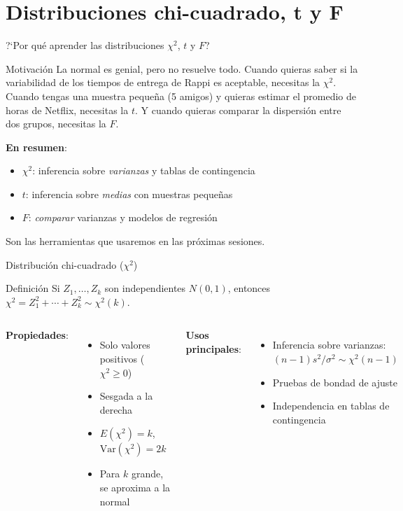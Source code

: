 \documentclass[aspectratio=169, 11pt]{beamer}
\begin{document}
\section{Distribuciones chi-cuadrado, t y F}

\begin{frame}{?`Por qu\'e aprender las distribuciones $\chi^2$, $t$ y $F$?}
\begin{exampleblock}{Motivaci\'on}
La normal es genial, pero no resuelve todo. Cuando quieras saber si la \alert{variabilidad} de los tiempos de entrega de Rappi es aceptable, necesitas la $\chi^2$. Cuando tengas una muestra peque\~na (5 amigos) y quieras estimar el promedio de horas de Netflix, necesitas la $t$. Y cuando quieras comparar la dispersi\'on entre dos grupos, necesitas la $F$.
\end{exampleblock}

\textbf{En resumen}:
\begin{itemize}\setlength{\itemsep}{1pt}
  \item \textbf{$\chi^2$}: inferencia sobre \emph{varianzas} y tablas de contingencia
  \item \textbf{$t$}: inferencia sobre \emph{medias} con muestras peque\~nas
  \item \textbf{$F$}: \emph{comparar} varianzas y modelos de regresi\'on
\end{itemize}

\alert{Son las herramientas que usaremos en las pr\'oximas sesiones.}
\end{frame}

\begin{frame}{Distribución chi-cuadrado ($\chi^2$)}
\begin{block}{Definición}
Si $Z_1, \ldots, Z_k$ son independientes $N(0,1)$, entonces
$\chi^2 = Z_1^2 + \cdots + Z_k^2 \sim \chi^2(k)$.
\end{block}

\begin{columns}[T]
\textbf{Propiedades}:
\begin{itemize}
\item Solo valores positivos ($\chi^2 \geq 0$)
\item Sesgada a la derecha
\item $E(\chi^2) = k$, \ $\text{Var}(\chi^2) = 2k$
\item Para $k$ grande, se aproxima a la normal
\end{itemize}

\textbf{Usos principales}:
\begin{itemize}
\item Inferencia sobre varianzas: $(n-1)s^2/\sigma^2 \sim \chi^2(n-1)$
\item Pruebas de bondad de ajuste
\item Independencia en tablas de contingencia
\end{itemize}
\end{columns}
\end{frame}
\end{document}
